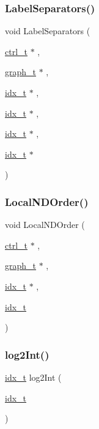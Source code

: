 \subsubsection{\texorpdfstring{Label\+Separators()}{LabelSeparators()}}
{\footnotesize\ttfamily void Label\+Separators (\begin{DoxyParamCaption}\item[{\hyperlink{a00742}{ctrl\+\_\+t} $\ast$}]{,  }\item[{\hyperlink{a00734}{graph\+\_\+t} $\ast$}]{,  }\item[{\hyperlink{a00876_aaa5262be3e700770163401acb0150f52}{idx\+\_\+t} $\ast$}]{,  }\item[{\hyperlink{a00876_aaa5262be3e700770163401acb0150f52}{idx\+\_\+t} $\ast$}]{,  }\item[{\hyperlink{a00876_aaa5262be3e700770163401acb0150f52}{idx\+\_\+t} $\ast$}]{,  }\item[{\hyperlink{a00876_aaa5262be3e700770163401acb0150f52}{idx\+\_\+t} $\ast$}]{ }\end{DoxyParamCaption})}

\mbox{\label{a00951_a312079f26a0db2e87443d2a0d9899a76}} 
\subsubsection{\texorpdfstring{Local\+N\+D\+Order()}{LocalNDOrder()}}
{\footnotesize\ttfamily void Local\+N\+D\+Order (\begin{DoxyParamCaption}\item[{\hyperlink{a00742}{ctrl\+\_\+t} $\ast$}]{,  }\item[{\hyperlink{a00734}{graph\+\_\+t} $\ast$}]{,  }\item[{\hyperlink{a00876_aaa5262be3e700770163401acb0150f52}{idx\+\_\+t} $\ast$}]{,  }\item[{\hyperlink{a00876_aaa5262be3e700770163401acb0150f52}{idx\+\_\+t}}]{ }\end{DoxyParamCaption})}

\mbox{\label{a00951_a665de391a0d3509b2a90ceff7aa73d5c}} 
\subsubsection{\texorpdfstring{log2\+Int()}{log2Int()}}
{\footnotesize\ttfamily \hyperlink{a00876_aaa5262be3e700770163401acb0150f52}{idx\+\_\+t} log2\+Int (\begin{DoxyParamCaption}\item[{\hyperlink{a00876_aaa5262be3e700770163401acb0150f52}{idx\+\_\+t}}]{ }\end{DoxyParamCaption})}


